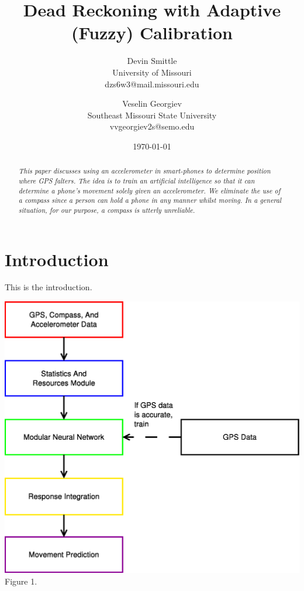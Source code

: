 \documentclass[twocolumn]{article}
\begin{document}
\title{Dead Reckoning with Adaptive (Fuzzy) Calibration}
\author{ Devin Smittle \\ University of Missouri \\
  dzs6w3@mail.missouri.edu \and Veselin Georgiev \\ Southeast Missouri
  State University \\ vvgeorgiev2s@semo.edu} \date{\today}
\maketitle

\begin{abstract}
  \emph{This paper discusses using an accelerometer in smart-phones to
    determine position where GPS falters. The idea is to train an
    artificial intelligence so that it can determine a phone's
    movement solely given an accelerometer. We eliminate the use of a
    compass since a person can hold a phone in any manner whilst
    moving. In a general situation, for our purpose, a compass is
    utterly unreliable.}
\end{abstract}

\section{Introduction}

This is the introduction.

\begin{center}

\includegraphics[width=0.9\columnwidth,keepaspectratio]{../figures/process_diagram/process}
\\
Figure 1.
  
\end{center}
\end{document}
